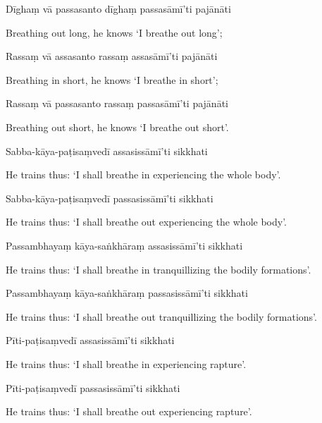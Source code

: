 Dīghaṃ vā passasanto dīghaṃ passasāmī'ti pajānāti

\begin{english}
  Breathing out long, he knows `I breathe out long';
\end{english}

Rassaṃ vā assasanto rassaṃ assasāmī'ti pajānāti

\begin{english}
  Breathing in short, he knows `I breathe in short';
\end{english}

Rassaṃ vā passasanto rassaṃ passasāmī'ti pajānāti

\begin{english}
  Breathing out short, he knows `I breathe out short'.
\end{english}

Sabba-kāya-paṭisaṃvedī assasissāmī'ti sikkhati

\begin{english}
  He trains thus: `I shall breathe in experiencing the whole body'.
\end{english}

Sabba-kāya-paṭisaṃvedī passasissāmī'ti sikkhati

\begin{english}
  He trains thus: `I shall breathe out experiencing the whole body'.
\end{english}

Passambhayaṃ kāya-saṅkhāraṃ assasissāmī'ti sikkhati

\begin{english}
  He trains thus: `I shall breathe in tranquillizing the bodily formations'.
\end{english}

Passambhayaṃ kāya-saṅkhāraṃ passasissāmī'ti sikkhati

\begin{english}
  He trains thus: `I shall breathe out tranquillizing the bodily formations'.
\end{english}

Pīti-paṭisaṃvedī assasissāmī'ti sikkhati

\begin{english}
  He trains thus: `I shall breathe in experiencing rapture'.
\end{english}

Pīti-paṭisaṃvedī passasissāmī'ti sikkhati

\begin{english}
  He trains thus: `I shall breathe out experiencing rapture'.
\end{english}

